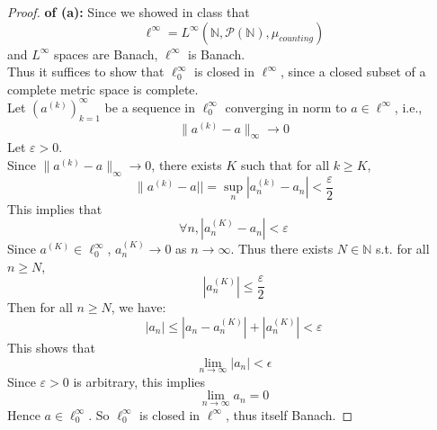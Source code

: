 \documentclass[lang=cn,11pt]{elegantbook}
\begin{document}
\begin{proof}
 \textbf{of (a): }  Since we showed in class that \[
\ell^\infty =L^\infty (\mathbb{N}, \mathcal{P}(\mathbb{N}), \mu_{counting} )
\] and $L^\infty$ spaces are Banach, $\ell^\infty$ is Banach.\\
Thus it suffices to show that $\ell^\infty_0$ is closed in $\ell^\infty$, since a closed subset of a complete metric space is complete.\\
Let \((a^{(k)})_{k=1}^\infty\) be a sequence in \(\ell^\infty_0\) converging in norm to \(a \in \ell^\infty\), i.e.,
\[
\|a^{(k)} - a\|_\infty \to 0
\]
Let $\varepsilon > 0$.\\
Since $\|a^{(k)} - a\|_\infty \to 0$, there exists \(K\) such that for all \(k \geq K\),
\[
   \| a^{(k)} - a||  =  \sup_n |a_n^{(k)} - a_n| < \frac{\varepsilon}{2}  
\]
This implies that \[
\forall n, |a_n^{(K)} - a_n| < \varepsilon
\]Since \(a^{(K)} \in \ell^\infty_0\), \(a_n^{(K)} \to 0\) as \(n \to \infty\). Thus there exists $N \in \mathbb{N}$ s.t. for all $n\geq N$, \[
|a_n^{(K)} | \leq \frac{\varepsilon}{2}
\]
Then for all $n\geq N$, we have:
\[
|a_n| \leq |a_n - a_n^{(K)}| + |a_n^{(K)}| < \varepsilon
\]
This shows that \[
\lim_{n\to \infty} |a_n  | <\epsilon
\]
Since $\varepsilon>0$ is arbitrary, this implies \[\lim_{  n \to \infty} a_n = 0\]
Hence \(a \in \ell^\infty_0\). So \(\ell^\infty_0\) is closed in \(\ell^\infty\), thus itself Banach.
\end{proof}
\end{document}
